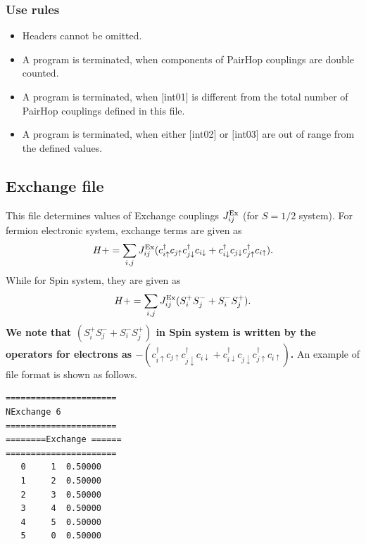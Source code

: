 \subsubsection{Use rules}
\begin{itemize}
\item Headers cannot be omitted. 
\item A program is terminated, when components of PairHop couplings are double counted.
\item A program is terminated, when $[$int01$]$ is different from the total number of PairHop couplings defined in this file.
\item A program is terminated, when either $[$int02$]$ or $[$int03$]$ are out of range from the defined values.
\end{itemize}

\newpage
\subsection{Exchange file}
This file determines values of Exchange couplings $J_{ij}^{\rm Ex}$ {(for $S=1/2$ system)}.
For fermion electronic system, exchange terms are given as
\begin{equation}
H+=\sum_{i,j}J_{ij}^{\rm Ex} (c_ {i \uparrow}^{\dag}c_{j\uparrow}c_{j \downarrow}^{\dag}c_{i  \downarrow}+c_ {i \downarrow}^{\dag}c_{j\downarrow}c_{j \uparrow}^{\dag}c_{i  \uparrow}).
\end{equation}
While for Spin system, they are given as
\begin{equation}
H+=\sum_{i,j}J_{ij}^{\rm Ex} (S_ {i}^{+}S_{j}^-+ S_ {i}^{-}S_{j}^+).
\end{equation}
{\bf We note that $(S_i^+S_j^-+S_i^-S_j^+)$ in Spin system is written by the
operators for electrons as 
$-(c_ {i \uparrow}^{\dag}c_{j\uparrow}c_{j \downarrow}^{\dag}c_{i  \downarrow}
+c_ {i \downarrow}^{\dag}c_{j\downarrow}c_{j \uparrow}^{\dag}c_{i  \uparrow})$.
}
An example of file format is shown as follows.

\begin{minipage}{12.5cm}
\begin{screen}
\begin{verbatim}
====================== 
NExchange 6  
====================== 
========Exchange ====== 
====================== 
   0     1  0.50000
   1     2  0.50000
   2     3  0.50000
   3     4  0.50000
   4     5  0.50000
   5     0  0.50000
\end{verbatim}
\end{screen}
\end{minipage}

